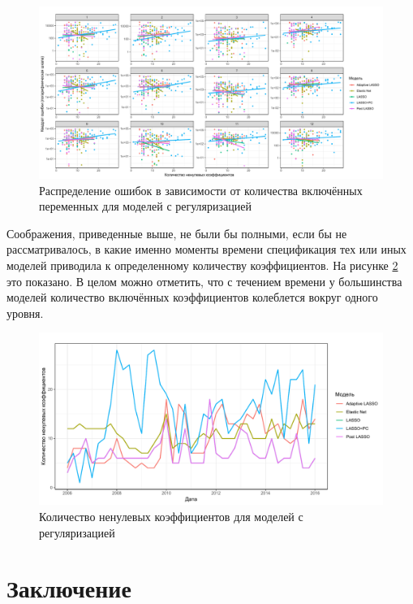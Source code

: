 \begin{figure}[h]
    \centering
    \includegraphics[width = \textwidth]{nonzeroerror.pdf}
    \caption{Распределение ошибок в зависимости от количества включённых переменных для моделей с регуляризацией}
    \label{fig:nzerror}
\end{figure}

Соображения, приведенные выше, не были бы полными, если бы не рассматривалось, в какие именно моменты времени спецификация тех или иных моделей приводила к определенному количеству коэффициентов. На рисунке \ref{fig:nztime} это показано. В целом можно отметить, что с течением времени у большинства моделей количество включённых коэффициентов колеблется вокруг одного уровня.

\begin{figure}[h]
    \centering
    \includegraphics[width = \textwidth]{nonzerotime.pdf}
    \caption{Количество ненулевых коэффициентов для моделей с регуляризацией}
    \label{fig:nztime}
\end{figure}

\chapter*{Заключение} \label{ch:final}

